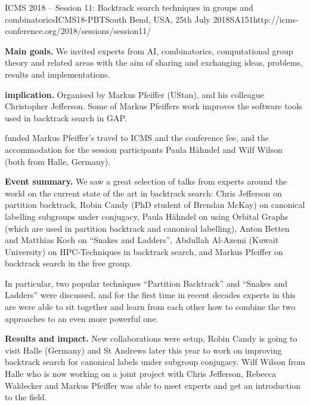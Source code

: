 \begin{event}{ICMS 2018 -- Session 11: Backtrack search techniques in groups and combinatorics}{ICMS18-PBT}{South Bend, USA, 25th July 2018}{SA}{15}{1}{http://icms-conference.org/2018/sessions/session11/}

\textbf{Main goals.}
We invited experts from AI, combinatorics, computational group theory and
related areas with the aim of sharing and exchanging ideas, problems,
results and implementations.

\textbf{\ODK implication.} Organised by Markus Pfeiffer (UStan), and his
colleague Christopher Jefferson. Some of Markus Pfeiffers work improves the
software tools used in backtrack search in GAP.

\ODK funded Markus Pfeiffer's travel to ICMS and the conference fee, and the
accommodation for the session participants Paula Hähndel and Wilf Wilson (both
from Halle, Germany).

\textbf{Event summary.} We saw a great selection of talks from experts around
the world on the current state of the art in backtrack search: Chris Jefferson
on partition backtrack, Robin Candy (PhD student of Brendan McKay) on canonical
labelling subgroups under conjugacy, Paula Hähndel on using Orbital Graphs
(which are used in partition backtrack and canonical labelling), Anton Betten
and Matthias Koch on ``Snakes and Ladders'', Abdullah Al-Azemi (Kuwait
University) on HPC-Techniques in backtrack search, and Markus Pfeiffer on
backtrack search in the free group.

In particular, two popular techniques ``Partition Backtrack'' and ``Snakes and
Ladders'' were discussed, and for the first time in recent decades experts in
this are were able to sit together and learn from each other how to combine the
two approaches to an even more powerful one.

\textbf{Results and impact.} New collaborations were setup, Robin Candy is going
to visit Halle (Germany) and St Andrews later this year to work on improving
backtrack search for canonical labels under subgroup conjugacy. Wilf Wilson from
Halle who is now working on a joint project with Chris Jefferson, Rebecca
Waldecker and Markus Pfeiffer was able to meet experts and get an introduction
to the field.

\end{event}
